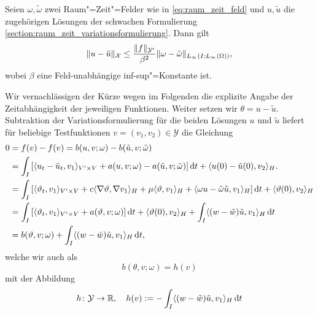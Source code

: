 \begin{Lemma}
\label{lemma:stabilitaetsaussage}
    Seien $\omega, \tilde{\omega}$ zwei Raum"=Zeit"=Felder wie in \cref{eq:raum_zeit_feld} und $u, \tilde{u}$ die zugehörigen Lösungen der schwachen Formulierung \cref{section:raum_zeit_variationsformulierung}.
    Dann gilt
    \begin{equation}
        \lVert u - \tilde{u}\rVert_{\mathcal X} \leq \frac{\lVert f\rVert_{\mathcal Y'}}{\beta^{2}} \lVert\omega - \tilde{\omega}\rVert_{L_{\infty}(I; L_{\infty}(\Omega))},
    \end{equation}
    wobei $\beta$ eine Feld-unabhängige inf-sup"=Konstante ist.

    \begin{Beweis}
        Wir vernachlässigen der Kürze wegen im Folgenden die explizite Angabe der Zeitabhängigkeit der jeweiligen Funktionen.
        Weiter setzen wir $\theta = u - \tilde{u}$.
        Subtraktion der Variationsformulierung für die beiden Lösungen $u$ und $\tilde{u}$ liefert für beliebige Testfunktionen $v = (v_{1}, v_{2}) \in \mathcal Y$ die Gleichung
        \begin{align}
            0
            &= f(v) - f(v) = b(u, v; \omega) - b(\tilde{u}, v; \tilde{\omega})
           \\&= \int_{I} \left[ \langle u_{t} - \tilde{u}_{t},v_{1}\rangle_{V' \times V} + a(u, v; \omega) - a(\tilde{u}, v; \tilde{\omega}) \right] \mathop{}\!\mathrm{d} t + \langle u(0) - \tilde{u}(0),v_{2}\rangle_{H}.
           \\&= \int_{I} \left[ \langle\vartheta_{t},v_{1}\rangle_{V' \times V} + c \langle\nabla \vartheta,\nabla v_{1}\rangle_{H} + \mu \langle\vartheta,v_{1}\rangle_{H} + \langle\omega u - \tilde{\omega}\tilde{u},v_{1}\rangle_{H} \right] \mathop{}\!\mathrm{d} t + \langle\vartheta(0),v_{2}\rangle_{H}
           \\&= \int_{I} \left[ \langle\vartheta_{t},v_{1}\rangle_{V' \times V} + a(\vartheta, v; \omega) \right] \mathop{}\!\mathrm{d} t + \langle\vartheta(0),v_{2}\rangle_{H} + \int_{I} \langle(w - \tilde{w})\tilde{u},v_{1}\rangle_{H} \mathop{}\!\mathrm{d} t
           \\&= b(\vartheta, v; \omega) + \int_{I} \langle(w - \tilde{w})\tilde{u},v_{1}\rangle_{H} \mathop{}\!\mathrm{d} t,
        \end{align}
        welche wir auch als
        \begin{equation}
            \label{eq:stabilitaetsaussage:beweis:variationsproblem}
            b(\theta, v; \omega) = h(v)
        \end{equation}
        mit der Abbildung
        \begin{equation}
            h \colon \mathcal Y \to \mathbb{R}, \quad h(v) := - \int_{I} \skp{(w - \tilde{w})\tilde{u}}{v_{1}}{H} \diff t

\end{equation}
\end{Beweis}
\end{Lemma}
